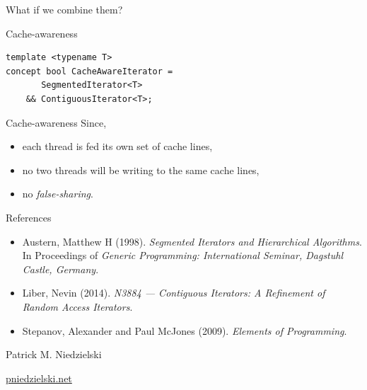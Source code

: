 \documentclass[aspectratio=169]{beamer}
\begin{document}

\begin{frame}[standout]
  What if we combine them?
\end{frame}


\begin{frame}[fragile]{Cache-awareness}
\begin{lstlisting}
template <typename T>
concept bool CacheAwareIterator =
       SegmentedIterator<T>
    && ContiguousIterator<T>;
\end{lstlisting}
\end{frame}


\begin{frame}{Cache-awareness}
  Since,
  \begin{itemize}
  \item<1-> each thread is fed its own set of cache lines,
  \item<2-> no two threads will be writing to the same cache lines,
  \item<3-> no \textit{false-sharing}.
  \end{itemize}
\end{frame}


\begin{frame}[standout]
\end{frame}


\begin{frame}{References}
  \begin{itemize}
  \item Austern, Matthew H (1998). \textit{Segmented Iterators and
      Hierarchical Algorithms}. In Proceedings of \textit{Generic Programming:
      International Seminar, Dagstuhl Castle, Germany}.
  \item Liber, Nevin (2014).  \textit{N3884 --- Contiguous Iterators:
      A Refinement of Random Access Iterators}.
  \item Stepanov, Alexander and Paul McJones (2009).  \textit{Elements
      of Programming}.
  \end{itemize}
\end{frame}


\begin{frame}[standout]
  Patrick M. Niedzielski

  \url{pniedzielski.net}

  \vfill
  \footnotesize{
    \doclicenseThis
  }
\end{frame}
\end{document}
